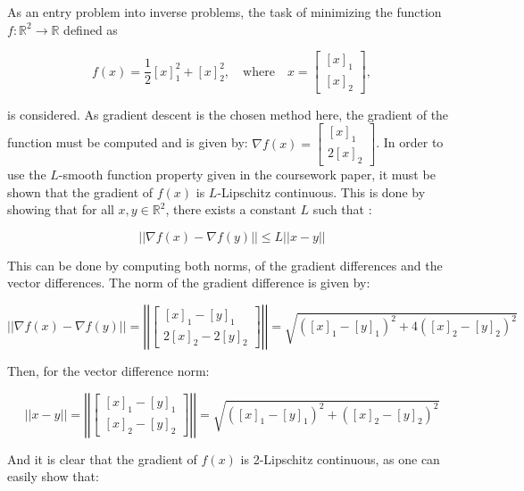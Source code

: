 \documentclass[12pt]{report} %
\begin{document}
As an entry problem into inverse problems, the task of minimizing the function \(f: \mathbb{R}^2 \to \mathbb{R}\) defined as

\begin{equation}
f(x) = \frac{1}{2} [x]_1^2 + [x]_2^2, \quad \text{where} \quad x = \begin{bmatrix} [x]_1 \\ [x]_2 \end{bmatrix},
\end{equation}

is considered. As gradient descent is the chosen method here, the gradient of the function must be computed and is given by: $\nabla f(x) = \begin{bmatrix} [x]_1 \\ 2[x]_2 \end{bmatrix}$. In order to use the $L$-smooth function property given in the coursework paper, it must be shown that the gradient of $f(x)$ is $L$-Lipschitz continuous. This is done by showing that for all $x, y \in \mathbb{R}^2$, there exists a constant $L$ such that \cite{lecture3}:

\begin{equation}
    ||\nabla f(x) - \nabla f(y)|| \leq L||x - y||
\end{equation}

This can be done by computing both norms, of the gradient differences and the vector differences. The norm of the gradient difference is given by:

\begin{equation}
    ||\nabla f(x) - \nabla f(y)|| = \left|\left| \begin{bmatrix} [x]_1 - [y]_1 \\ 2[x]_2 - 2[y]_2 \end{bmatrix} \right|\right| = \sqrt{([x]_1 - [y]_1)^2 + 4([x]_2 - [y]_2)^2}
\end{equation}

Then, for the vector difference norm:

\begin{equation}
    ||x - y|| = \left|\left| \begin{bmatrix} [x]_1 - [y]_1 \\ [x]_2 - [y]_2 \end{bmatrix} \right|\right| = \sqrt{([x]_1 - [y]_1)^2 + ([x]_2 - [y]_2)^2}
\end{equation}

And it is clear that the gradient of $f(x)$ is 2-Lipschitz continuous, as one can easily show that:
\end{document}
